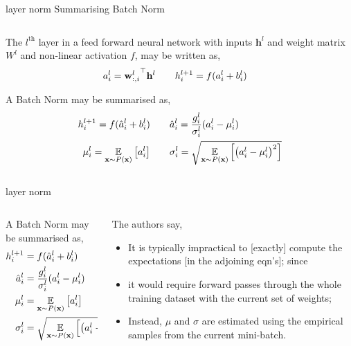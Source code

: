 \documentclass[aspectratio=169,xcolor={dvipsnames,svgnames}]{beamer}
\begin{document}
\begin{frame}[label={sec:layer-norm}]{layer norm}
Summarising Batch Norm
\begin{columns}
\begin{column}{0.7\columnwidth}
The \(l^{\text{th}}\) layer in a feed forward neural
network with inputs \(\mathbf{h}^l\) and weight matrix
\(W^{l}\) and non-linear activation \(f\), may be written
as,
\begin{align}
  \notag
  a_i^l &= {\mathbf{w}_{:,i}^l}^\top\mathbf{h}^l
          \qquad h_i^{l+1} = f(a_i^l+b_i^l) 
\end{align}

A Batch Norm may be summarised as,
\begin{align}
  \notag
  h_i^{l+1} = f(\hat{a}_i^l+b_i^l)
  &\qquad
    \hat{a}_i^l = \frac{g_i^l}{\sigma_i^l} (a_i^l -
    \mu_i^l) \\
  \notag
  \mu_i^l = \underset{\mathbf{x}\sim P(\mathbf{x})}
  {\mathbb{E}} \left[a_i^l\right]
  &\qquad
    \sigma_i^l = \sqrt{\underset{\mathbf{x}\sim
    P(\mathbf{x})} {\mathbb{E}} \left[\left(a_i^l -
    \mu_i^l\right)^2\right]}
\end{align}
\end{column}
\end{columns}
\end{frame}

\begin{frame}[label={sec:org38547fc}]{layer norm}
\begin{columns}
\begin{column}{0.45\columnwidth}
A Batch Norm may be summarised as,
\begin{align}
  \notag
  h_i^{l+1} &= f(\hat{a}_i^l+b_i^l) \\
  \notag
  \hat{a}_i^l &= \frac{g_i^l}{\sigma_i^l} (a_i^l -
  \mu_i^l) \\
  \notag
  \mu_i^l &= \underset{\mathbf{x}\sim P(\mathbf{x})}
  {\mathbb{E}} \left[a_i^l\right] \\
  \notag
  \sigma_i^l &= \sqrt{\underset{\mathbf{x}\sim
  P(\mathbf{x})} {\mathbb{E}} \left[\left(a_i^l -
  \mu_i^l\right)^2\right]}
\end{align}
\end{column}


\begin{column}{0.55\columnwidth}
The authors say,
\begin{itemize}
\item It is typically impractical to [exactly] compute the
expectations [in the adjoining eqn's]; since
\item it would require forward passes through the whole
training dataset with the current set of weights;
\item Instead, \(\mu\) and \(\sigma\) are estimated using the
empirical samples from the current mini-batch.
\end{itemize}
\end{column}
\end{columns}
\end{frame}
\end{document}
